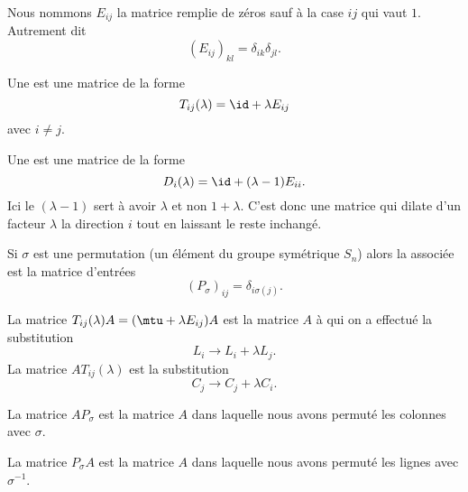 Nous nommons \( E_{ij}\) la matrice remplie de zéros sauf à la case \( ij\) qui vaut \( 1\). Autrement dit
\begin{equation}
    (E_{ij})_{kl}=\delta_{ik}\delta_{jl}.
\end{equation}
\begin{definition}
    Une  est une matrice de la forme
    \begin{equation}
        T_{ij}(\lambda)=\id+\lambda E_{ij}
    \end{equation}
    avec \( i\neq j\).

    Une  est une matrice de la forme
    \begin{equation}
        D_i(\lambda)=\id+(\lambda-1)E_{ii}.
    \end{equation}
    Ici le \( (\lambda-1)\) sert à avoir \( \lambda\) et non \( 1+\lambda\). C'est donc une matrice qui dilate d'un facteur \( \lambda\) la direction \( i\) tout en laissant le reste inchangé.

    Si \( \sigma\) est une permutation (un élément du groupe symétrique \( S_n\)) alors la  associée est la matrice d'entrées
    \begin{equation}
        (P_{\sigma})_{ij}=\delta_{i\sigma(j)}.
    \end{equation}
\end{definition}

\begin{lemma}   \label{LemyrAXQs}
    La matrice \( T_{ij}(\lambda)A=(\mtu+\lambda E_{ij})A\) est la matrice \( A\) à qui on a effectué la substitution
    \begin{equation}
        L_i\to L_i+\lambda L_j.
    \end{equation}
    La matrice \( AT_{ij}(\lambda)\) est la substitution 
    \begin{equation}
        C_j\to C_j+\lambda C_i.
    \end{equation}

    La matrice \( AP_{\sigma}\) est la matrice \( A\) dans laquelle nous avons permuté les colonnes avec \( \sigma\).

    La matrice \( P_{\sigma}A\) est la matrice \( A\) dans laquelle nous avons permuté les lignes avec \( \sigma^{-1}\).
\end{lemma}

